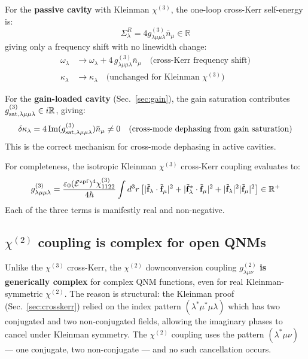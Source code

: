 \documentclass[12pt]{article}
\newcommand{\zpf}{{\rm zpf}}
\begin{document}
For the \textbf{passive cavity} with Kleinman $\chi^{(3)}$, the
one-loop cross-Kerr self-energy is:
\begin{equation}
  \Sigma^R_\lambda = 4g^{(3)}_{\lambda\mu\mu\lambda}\bar{n}_\mu
  \in\mathbb{R}
  \label{eq:sigma_xkerr}
\end{equation}
giving only a frequency shift with no linewidth change:
\begin{align}
  \omega_\lambda &\to \omega_\lambda
  +4\,g^{(3)}_{\lambda\mu\mu\lambda}\bar{n}_\mu
  \quad\text{(cross-Kerr frequency shift)}
  \label{eq:cross_shift}\\
  \kappa_\lambda &\to \kappa_\lambda
  \quad\text{(unchanged for Kleinman $\chi^{(3)}$)}
  \label{eq:cross_no_dephasing}
\end{align}

For the \textbf{gain-loaded cavity} (Sec.~\ref{sec:gain}), the gain
saturation contributes $g^{(3)}_{\rm sat,\lambda\mu\mu\lambda}\in i\mathbb{R}$,
giving:
\begin{equation}
  \delta\kappa_\lambda =
  4\,\mathrm{Im}(g^{(3)}_{\rm sat,\lambda\mu\mu\lambda})\bar{n}_\mu
  \neq 0
  \quad\text{(cross-mode dephasing from gain saturation)}
\end{equation}
This is the correct mechanism for cross-mode dephasing in active cavities.

For completeness, the isotropic Kleinman $\chi^{(3)}$ cross-Kerr
coupling evaluates to:
\begin{equation}
  g^{(3)}_{\lambda\mu\mu\lambda}
  = \frac{\varepsilon_0(\mathcal{E}^\zpf)^4\chi^{(3)}_{1122}}{4\hbar}
  \int d^3r\,
  \bigl[|\tilde{\mathbf{f}}_\lambda\cdot\tilde{\mathbf{f}}_\mu|^2
  + |\tilde{\mathbf{f}}^*_\lambda\cdot\tilde{\mathbf{f}}_\mu|^2
  + |\tilde{\mathbf{f}}_\lambda|^2|\tilde{\mathbf{f}}_\mu|^2\bigr]
  \in\mathbb{R}^+
  \label{eq:crosskerr_isotropic}
\end{equation}
Each of the three terms is manifestly real and non-negative.

\subsection{$\chi^{(2)}$ coupling is complex for open QNMs}
\label{sec:chi2_complex}

Unlike the $\chi^{(3)}$ cross-Kerr, the $\chi^{(2)}$ downconversion
coupling $g^{(2)}_{\lambda\mu\nu}$ \textbf{is generically complex}
for complex QNM functions, even for real Kleinman-symmetric $\chi^{(2)}$.
The reason is structural: the Kleinman proof (Sec.~\ref{sec:crosskerr})
relied on the index pattern $(\lambda^*\mu^*\mu\lambda)$ which has two
conjugated and two non-conjugated fields, allowing the imaginary phases
to cancel under Kleinman symmetry.  The $\chi^{(2)}$ coupling uses
the pattern $(\lambda^*\mu\nu)$ — one conjugate, two non-conjugate — and
no such cancellation occurs.
\end{document}
